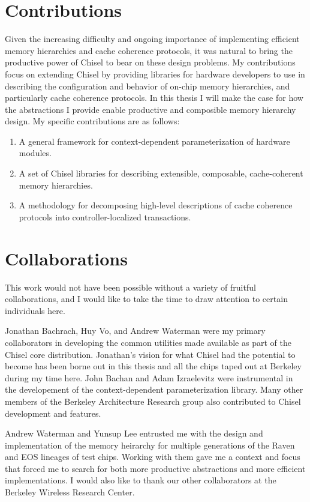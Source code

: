 \section{Contributions}

Given the increasing difficulty and ongoing importance of implementing efficient memory hierarchies and cache coherence protocols, it was natural to bring the productive power of Chisel to bear on these design problems.
My contributions focus on extending Chisel by providing libraries for hardware developers to use in describing the configuration and behavior of on-chip memory hierarchies, and particularly cache coherence protocols.
In this thesis I will make the case for how the abstractions I provide enable productive and composible memory hierarchy design.
My specific contributions are as follows:

\begin{enumerate}
\item A general framework for context-dependent parameterization of hardware modules.
\item A set of Chisel libraries for describing extensible, composable, cache-coherent memory hierarchies.
\item A methodology for decomposing high-level descriptions of cache coherence protocols into controller-localized transactions.
\end{enumerate}

\section{Collaborations}

This work would not have been possible without a variety of fruitful collaborations, and I would like to take the time to draw attention to certain individuals here.

Jonathan Bachrach, Huy Vo, and Andrew Waterman were my primary collaborators in developing the common utilities made available as part of the Chisel core distribution.
Jonathan's vision for what Chisel had the potential to become has been borne out in this thesis and all the chips taped out at Berkeley during my time here.
John Bachan and Adam Izraelevitz were instrumental in the developement of the context-dependent parameterization library. 
Many other members of the Berkeley Architecture Research group also contributed to Chisel development and features. 

Andrew Waterman and Yunsup Lee entrusted me with the design and implementation of the memory heirarchy for multiple generations of the Raven and EOS lineages of test chips.
Working with them gave me a context and focus that forced me to search for both more productive abstractions and more efficient implementations.
I would also like to thank our other collaborators at the Berkeley Wireless Research Center.

